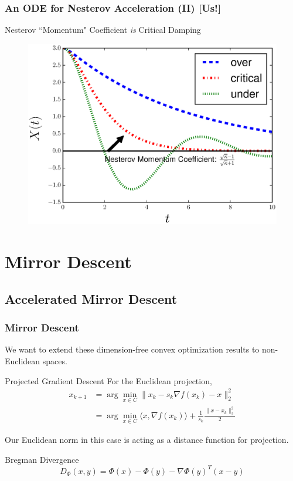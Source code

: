 \documentclass{beamer}
\begin{document}
\begin{frame}
\frametitle{An ODE for Nesterov Acceleration (II) [Us!]}

\begin{block}{Nesterov ``Momentum" Coefficient \textit{is} Critical Damping }
\begin{figure}
\includegraphics[width=0.8\linewidth]{Experiments/critical_damp_Nesterov.eps}
\caption{}
\end{figure}

\end{block}

\end{frame}

\section{Mirror Descent}

\subsection{Accelerated Mirror Descent}

\begin{frame}
\frametitle{Mirror Descent}
We want to extend these dimension-free convex optimization results to non-Euclidean spaces.
\begin{block}{Projected Gradient Descent}
For the Euclidean projection,
\begin{align*}
x_{k+1} &= \arg\min_{x \in C}\|x_k - s_k \nabla f(x_k) - x\|_2^2 \\
&= \arg\min_{x \in C} \langle x, \nabla f(x_k) \rangle + \frac{1}{s_k}\frac{\|x - x_k\|_2^2}{2}
\end{align*}
\end{block}
Our Euclidean norm in this case is acting as a distance function for projection.
\begin{block}{Bregman Divergence}
$$D_\Phi(x,y) = \Phi(x) - \Phi(y) - \nabla \Phi(y)^T(x-y)$$
\end{block}
\end{frame}
\end{document}
